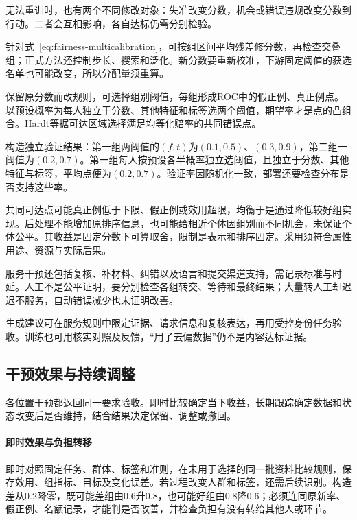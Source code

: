 无法重训时，也有两个不同修改对象：失准改变分数，机会或错误违规改变分数到行动。二者会互相影响，各自达标仍需分别检验。

针对式~\eqref{eq:fairness-multicalibration}，可按组区间平均残差修分数，再检查交叠组；正式方法还控制步长、搜索和泛化。新分数要重新校准，下游固定阈值的获选名单也可能改变，所以分配量须重算。

保留原分数而改规则，可选择组别阈值，每组形成ROC中的假正例、真正例点。以预设概率为每人独立于分数、其他特征和标签选两个阈值，期望率才是点的凸组合。Hardt等据可达区域选择满足均等化赔率的共同错误点。

\begin{example}[随机化如何补出共同错误率]
\label{ex:fairness-random-threshold}
构造独立验证结果：第一组两阈值的$(f,t)$为$(0.1,0.5)$、$(0.3,0.9)$，第二组一阈值为$(0.2,0.7)$。第一组每人按预设各半概率独立选阈值，且独立于分数、其他特征与标签，平均点便为$(0.2,0.7)$。验证率因随机化一致，部署还要检查分布是否支持这些率。
\end{example}

共同可达点可能真正例低于下限、假正例或效用超限，均衡于是通过降低较好组实现。后处理不能增加原排序信息，也可能给相近个体因组别而不同机会，未保证个体公平。其收益是固定分数下可算取舍，限制是表示和排序固定。采用须符合属性用途、资源与实际后果。

服务干预还包括复核、补材料、纠错以及语言和提交渠道支持，需记录标准与时延。人工不是公平证明，要分别检查各组转交、等待和最终结果；大量转人工却迟迟不服务，自动错误减少也未证明改善。

生成建议可在服务规则中限定证据、请求信息和复核表达，再用受控身份任务验收。训练也可用核实对照及反馈，“用了去偏数据”仍不是内容达标证据。

\subsection{干预效果与持续调整}
\label{sec:fairness-intervention-evaluation}
\label{sec:fairness-long-term}

各位置干预都返回同一要求验收。即时比较确定当下收益，长期跟踪确定数据和状态改变后是否维持，结合结果决定保留、调整或撤回。

\paragraph{即时效果与负担转移}

即时对照固定任务、群体、标签和准则，在未用于选择的同一批资料比较规则，保存效用、组指标、目标及变化误差。若过程改变人群和标签，还需后续识别。构造差从0.2降零，既可能差组由0.6升0.8，也可能好组由0.8降0.6；必须连同原新率、假正例、名额记录，才能判是否改善，并检查负担有没有转给其他人或环节。

